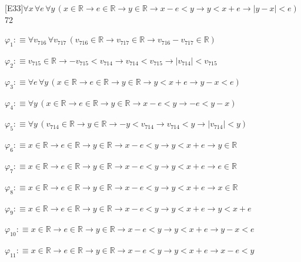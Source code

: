 \begin{fullproof}{[E33]}{$\forall x\,\forall e\,\forall y\,(x \in \mathbb{R} \to e \in \mathbb{R} \to y \in \mathbb{R} \to x - e < y \to y < x + e \to \lvert y - x \rvert < e)$}{72}
\begin{ptree}
\noLine
{}
\noLine
{}
\end{ptree}
\begin{abbrevlist}
\item $\varphi_{1} :\equiv \forall v_{716}\,\forall v_{717}\,(v_{716} \in \mathbb{R} \to v_{717} \in \mathbb{R} \to v_{716} - v_{717} \in \mathbb{R})$
\item $\varphi_{2} :\equiv v_{715} \in \mathbb{R} \to -v_{715} < v_{714} \to v_{714} < v_{715} \to \lvert v_{714} \rvert < v_{715}$
\item $\varphi_{3} :\equiv \forall e\,\forall y\,(x \in \mathbb{R} \to e \in \mathbb{R} \to y \in \mathbb{R} \to y < x + e \to y - x < e)$
\item $\varphi_{4} :\equiv \forall y\,(x \in \mathbb{R} \to e \in \mathbb{R} \to y \in \mathbb{R} \to x - e < y \to -e < y - x)$
\item $\varphi_{5} :\equiv \forall y\,(v_{714} \in \mathbb{R} \to y \in \mathbb{R} \to -y < v_{714} \to v_{714} < y \to \lvert v_{714} \rvert < y)$
\item $\varphi_{6} :\equiv x \in \mathbb{R} \to e \in \mathbb{R} \to y \in \mathbb{R} \to x - e < y \to y < x + e \to y \in \mathbb{R}$
\item $\varphi_{7} :\equiv x \in \mathbb{R} \to e \in \mathbb{R} \to y \in \mathbb{R} \to x - e < y \to y < x + e \to e \in \mathbb{R}$
\item $\varphi_{8} :\equiv x \in \mathbb{R} \to e \in \mathbb{R} \to y \in \mathbb{R} \to x - e < y \to y < x + e \to x \in \mathbb{R}$
\item $\varphi_{9} :\equiv x \in \mathbb{R} \to e \in \mathbb{R} \to y \in \mathbb{R} \to x - e < y \to y < x + e \to y < x + e$
\item $\varphi_{10} :\equiv x \in \mathbb{R} \to e \in \mathbb{R} \to y \in \mathbb{R} \to x - e < y \to y < x + e \to y - x < e$
\item $\varphi_{11} :\equiv x \in \mathbb{R} \to e \in \mathbb{R} \to y \in \mathbb{R} \to x - e < y \to y < x + e \to x - e < y$

\end{abbrevlist}
\end{fullproof}
